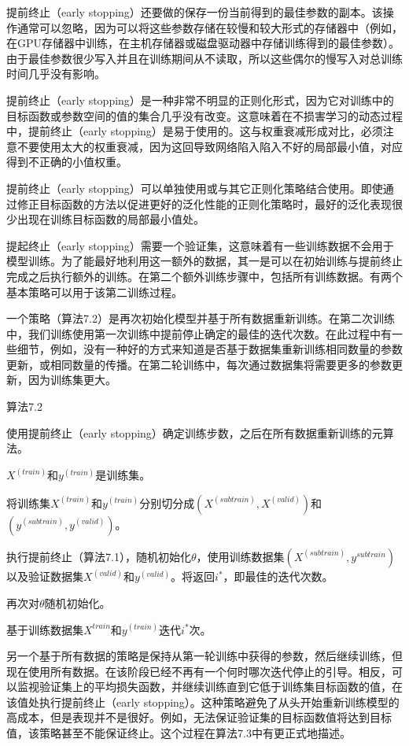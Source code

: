 提前终止（early stopping）还要做的保存一份当前得到的最佳参数的副本。该操作通常可以忽略，因为可以将这些参数存储在较慢和较大形式的存储器中（例如，在GPU存储器中训练，在主机存储器或磁盘驱动器中存储训练得到的最佳参数）。由于最佳参数很少写入并且在训练期间从不读取，所以这些偶尔的慢写入对总训练时间几乎没有影响。

提前终止（early stopping）是一种非常不明显的正则化形式，因为它对训练中的目标函数或参数空间的值的集合几乎没有改变。这意味着在不损害学习的动态过程中，提前终止（early stopping）是易于使用的。这与权重衰减形成对比，必须注意不要使用太大的权重衰减，因为这回导致网络陷入陷入不好的局部最小值，对应得到不正确的小值权重。

提前终止（early stopping）可以单独使用或与其它正则化策略结合使用。即使通过修正目标函数的方法以促进更好的泛化性能的正则化策略时，最好的泛化表现很少出现在训练目标函数的局部最小值处。

提起终止（early stopping）需要一个验证集，这意味着有一些训练数据不会用于模型训练。为了能最好地利用这一额外的数据，其一是可以在初始训练与提前终止完成之后执行额外的训练。在第二个额外训练步骤中，包括所有训练数据。有两个基本策略可以用于该第二训练过程。

一个策略（算法7.2）是再次初始化模型并基于所有数据重新训练。在第二次训练中，我们训练使用第一次训练中提前停止确定的最佳的迭代次数。在此过程中有一些细节，例如，没有一种好的方式来知道是否基于数据集重新训练相同数量的参数更新，或相同数量的传播。在第二轮训练中，每次通过数据集将需要更多的参数更新，因为训练集更大。

算法7.2

使用提前终止（early stopping）确定训练步数，之后在所有数据重新训练的元算法。

$X^{(train)}$和$y^{(train)}$是训练集。

将训练集$X^{(train)}$和$y^{(train)}$分别切分成$(X^{(subtrain)}, X^{(valid)})$和$(y^{(subtrain)}, y^{(valid)})$。

执行提前终止（算法7.1），随机初始化$\theta$，使用训练数据集$(X^{(subtrain)}, y^{subtrain})$以及验证数据集$X^{(valid)}$和$y^{(valid)}$。将返回$i^*$，即最佳的迭代次数。

再次对$\theta$随机初始化。


基于训练数据集$X^{train}$和$y^{(train)}$迭代$i^*$次。

另一个基于所有数据的策略是保持从第一轮训练中获得的参数，然后继续训练，但现在使用所有数据。在该阶段已经不再有一个何时哪次迭代停止的引导。相反，可以监视验证集上的平均损失函数，并继续训练直到它低于训练集目标函数的值，在该值处执行提前终止（early stopping）。这种策略避免了从头开始重新训练模型的高成本，但是表现并不是很好。例如，无法保证验证集的目标函数值将达到目标值，该策略甚至不能保证终止。这个过程在算法7.3中有更正式地描述。

